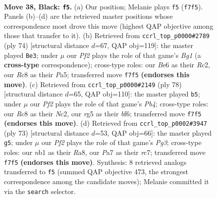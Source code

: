 \documentclass[11pt]{article}
\begin{document}
\clearpage

\begin{figure}[p]\centering
\begin{subfigure}{0.46\textwidth}\centering
\resizebox{\linewidth}{!}{%
\newchessgame
\chessboard[
  setfen={2r5/p1pk1pr1/P1p1b1p1/2P3Rp/1P3P1P/8/8/RN2K3 b Q - 5 38},
  showmover=false,
  pgfstyle=straightmove, color=movearrow, markmove={f7-f5}
]}
\caption{}
\end{subfigure}\hfill
\begin{subfigure}{0.46\textwidth}\centering
\resizebox{\linewidth}{!}{%
\newchessgame
\chessboard[
  setfen={3r2k1/8/p1rPpp1p/PpP1b1pP/6P1/3R1P2/2R3K1/6B1 w - - 3 38},
  showmover=false,
  pgfstyle=straightmove, color=movearrow, markmove={g1-e3}
]}
\caption{}
\end{subfigure}
\\[4pt]
\begin{subfigure}{0.46\textwidth}\centering
\resizebox{\linewidth}{!}{%
\newchessgame
\chessboard[
  setfen={2k3r1/1p6/2p2b2/2Pr1p2/PP1P1P2/5K1p/2N2B1P/3R4 w - - 0 40},
  showmover=false,
  pgfstyle=straightmove, color=movearrow, markmove={b4-b5}
]}
\caption{}
\end{subfigure}\hfill
\begin{subfigure}{0.46\textwidth}\centering
\resizebox{\linewidth}{!}{%
\newchessgame
\chessboard[
  setfen={r7/2R2p2/3Pbkp1/p7/Pp1Rp2r/4P2p/1P2BP1K/8 b - - 5 37},
  showmover=false,
  pgfstyle=straightmove, color=movearrow, markmove={g6-g5}
]}
\caption{}
\end{subfigure}
\caption{\textbf{Move 38, Black: \texttt{f5}.} (a) Our position; Melanie plays \texttt{f5} (\texttt{f7f5}). Panels (b)--(d) are the retrieved master positions whose correspondence most drove this move (highest QAP objective among those that transfer to it). (b) Retrieved from \texttt{ccrl\_top\_p0000\#2789} (ply 74) [structural distance $d$=67, QAP obj=119]: the master played \texttt{Be3}; under $\mu$ our \emph{Pf2} plays the role of that game's \emph{Bg1} (a \textbf{cross-type} correspondence); cross-type roles: our \emph{B}e6 as their \emph{R}c2, our \emph{R}c8 as their \emph{P}a5; transferred move \texttt{f7f5} \textbf{(endorses this move)}. (c) Retrieved from \texttt{ccrl\_top\_p0000\#2149} (ply 78) [structural distance $d$=65, QAP obj=110]: the master played \texttt{b5}; under $\mu$ our \emph{Pf2} plays the role of that game's \emph{Pb4}; cross-type roles: our \emph{R}c8 as their \emph{N}c2, our \emph{r}g5 as their \emph{b}f6; transferred move \texttt{f7f5} \textbf{(endorses this move)}. (d) Retrieved from \texttt{ccrl\_top\_p0002\#3947} (ply 73) [structural distance $d$=53, QAP obj=66]: the master played \texttt{g5}; under $\mu$ our \emph{Pf2} plays the role of that game's \emph{Pg3}; cross-type roles: our \emph{n}b1 as their \emph{R}a8, our \emph{P}a7 as their \emph{r}c7; transferred move \texttt{f7f5} \textbf{(endorses this move)}. Synthesis: 8 retrieved analogs transferred to \texttt{f5} (summed QAP objective 473, the strongest correspondence among the candidate moves); Melanie committed it via the \texttt{search} selector.}
\label{fig:thought-m75}
\end{figure}
\end{document}
